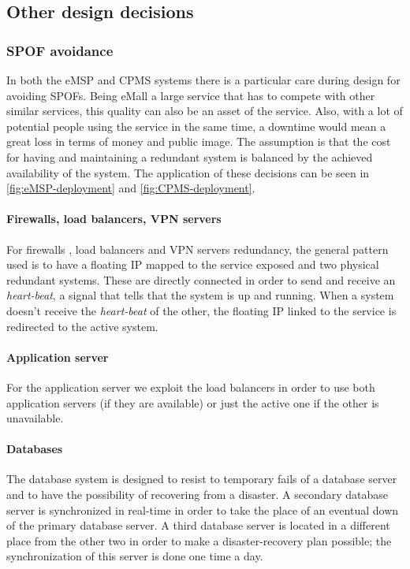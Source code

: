 \subsection{Other design decisions}
\subsubsection{\ac{SPOF} avoidance}
In both the \ac{eMSP} and \ac{CPMS} systems there is a particular care during design for avoiding \acp{SPOF}. Being \ac{eMall} a large service that has to compete with other similar services, this quality can also be an asset of the service. Also, with a lot of potential people using the service in the same time, a downtime would mean a great loss in terms of money and public image. The assumption is that the cost for having and maintaining a redundant system is balanced by the achieved availability of the system.
The application of these decisions can be seen in \autoref{fig:eMSP-deployment} and \autoref{fig:CPMS-deployment}.
\paragraph{Firewalls, load balancers, \ac{VPN} servers}
For firewalls \cite{ref:redundant-firewalls}, load balancers \cite{ref:redundant-load-balancers} and \ac{VPN} servers \cite{ref:redundant-VPN-servers} redundancy, the general pattern used is to have a floating IP \cite{ref:floating-ip} mapped to the service exposed and two physical redundant systems. These are directly connected in order to send and receive an \textit{heart-beat}, a signal that tells that the system is up and running. 
When a system doesn't receive the \textit{heart-beat} of the other, the floating IP linked to the service is redirected to the active system.
\paragraph{Application server}
For the application server we exploit the load balancers in order to use both application servers (if they are available) or just the active one if the other is unavailable.
\paragraph{Databases}
The database system is designed to resist to temporary fails of a database server and to have the possibility of recovering from a disaster. A secondary database server is synchronized in real-time in order to take the place of an eventual down of the primary database server. A third database server is located in a different place from the other two in order to make a disaster-recovery plan possible; the synchronization of this server is done one time a day.
\clearpage